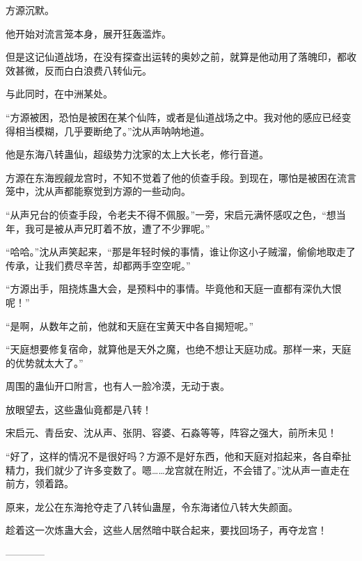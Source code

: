 \begin{this_body}
方源沉默。

他开始对流言笼本身，展开狂轰滥炸。

但是这记仙道战场，在没有探查出运转的奥妙之前，就算是他动用了落魄印，都收效甚微，反而白白浪费八转仙元。

与此同时，在中洲某处。

“方源被困，恐怕是被困在某个仙阵，或者是仙道战场之中。我对他的感应已经变得相当模糊，几乎要断绝了。”沈从声呐呐地道。

他是东海八转蛊仙，超级势力沈家的太上大长老，修行音道。

方源在东海觊觎龙宫时，不知不觉着了他的侦查手段。到现在，哪怕是被困在流言笼中，沈从声都能察觉到方源的一些动向。

“从声兄台的侦查手段，令老夫不得不佩服。”一旁，宋启元满怀感叹之色，“想当年，我可是被从声兄盯着不放，遭了不少罪呢。”

“哈哈。”沈从声笑起来，“那是年轻时候的事情，谁让你这小子贼溜，偷偷地取走了传承，让我们费尽辛苦，却都两手空空呢。”

“方源出手，阻挠炼蛊大会，是预料中的事情。毕竟他和天庭一直都有深仇大恨呢！”

“是啊，从数年之前，他就和天庭在宝黄天中各自揭短呢。”

“天庭想要修复宿命，就算他是天外之魔，也绝不想让天庭功成。那样一来，天庭的优势就太大了。”

周围的蛊仙开口附言，也有人一脸冷漠，无动于衷。

放眼望去，这些蛊仙竟都是八转！

宋启元、青岳安、沈从声、张阴、容婆、石淼等等，阵容之强大，前所未见！

“好了，这样的情况不是很好吗？方源不是好东西，他和天庭对掐起来，各自牵扯精力，我们就少了许多变数了。嗯……龙宫就在附近，不会错了。”沈从声一直走在前方，领着路。

原来，龙公在东海抢夺走了八转仙蛊屋，令东海诸位八转大失颜面。

趁着这一次炼蛊大会，这些人居然暗中联合起来，要找回场子，再夺龙宫！

------------

\end{this_body}

